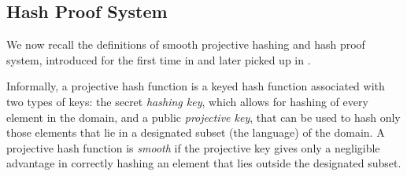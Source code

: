 


\subsection{Hash Proof System}\label{subsec:HPF}
We now recall the definitions of smooth projective hashing and hash proof system, introduced for the first time in \cite{CS02} and later picked up in \cite{JKRS20}.

Informally, a projective hash function is a keyed hash function associated with two types of keys: the secret \textit{hashing key}, which allows for hashing of every element in the domain, and a public \textit{projective key}, that can be used to hash only those elements that lie in a designated subset (the language) of the domain.
A projective hash function is \textit{smooth} if the projective key gives only a negligible advantage in correctly hashing an element that lies outside the designated subset.

